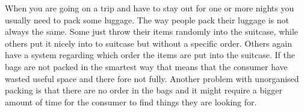When you are going on a trip and have to stay out for one or more nights you usually need to pack some luggage. The way people pack their luggage is not always the same. Some just throw their items randomly into the suitcase, while others put it nicely into to suitcase but without a specific order.
Others again have a system regarding which order the items are put into the suitcase. If the bags are not packed in the smartest way that means that the consumer have wasted useful space and there fore not fully.
Another problem with unorganised packing is that there are no order in the bags and it might require a bigger amount of time for the consumer to find things they are looking for.